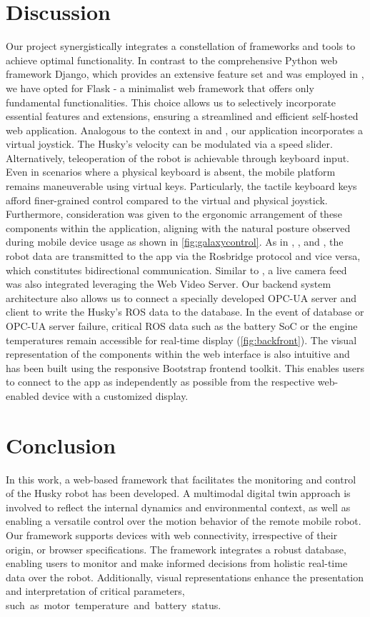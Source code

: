 \documentclass[conference]{IEEEtran}
\begin{document}
\section{Discussion}
Our project synergistically integrates a constellation of frameworks and tools to achieve optimal functionality. In contrast to the comprehensive Python web framework Django, which provides an extensive feature set \cite{django} and was employed in \cite{kapic}, we have opted for Flask - a minimalist web framework that offers only fundamental functionalities. 
This choice allows us to selectively incorporate essential features and extensions, ensuring a streamlined and efficient self-hosted web application. 
Analogous to the context in \cite{kapic} and \cite{dinodi}, our application incorporates a virtual joystick.
The Husky's velocity can be modulated via a speed slider. Alternatively, teleoperation of the robot is achievable through keyboard input. Even in scenarios where a physical keyboard is absent, the mobile platform remains maneuverable using virtual keys. Particularly, the tactile keyboard keys afford finer-grained control compared to the virtual and physical joystick. 
Furthermore, consideration was given to the ergonomic arrangement of these components within the application, aligning with the natural posture observed during mobile device usage as shown in  \cref{fig:galaxycontrol}.
As in \cite{kapic}, \cite{dinodi}, \cite{johnson} and \cite{wang}, the robot data are transmitted to the app via the Rosbridge protocol and vice versa, which constitutes bidirectional communication. Similar to \cite{johnson}, a live camera feed was also integrated leveraging the Web Video Server.
Our backend system architecture also allows us to connect a specially developed OPC-UA server and client to write the Husky's ROS data to the database. In the event of database or OPC-UA server failure, critical ROS data such as the battery SoC or the engine temperatures remain accessible for real-time display (\cref{fig:backfront}).
The visual representation of the components within the web interface is also intuitive and has been built using the responsive Bootstrap frontend toolkit. This enables users to connect to the app as independently as possible from the respective web-enabled device with a customized display.

\section{Conclusion}
In this work, a web-based framework that facilitates the monitoring and control of the Husky robot has been developed. A multimodal digital twin approach is involved to reflect the internal dynamics and environmental context, as well as enabling a versatile control over the motion behavior of the remote mobile robot. 
Our framework supports devices with web connectivity, irrespective of their origin, or browser specifications. The framework integrates a robust database, enabling users to monitor and make  informed decisions from holistic real-time data over the robot. 
Additionally, visual representations enhance the presentation and interpretation of critical parameters, \mbox{such as motor temperature and battery status.}
\end{document}
